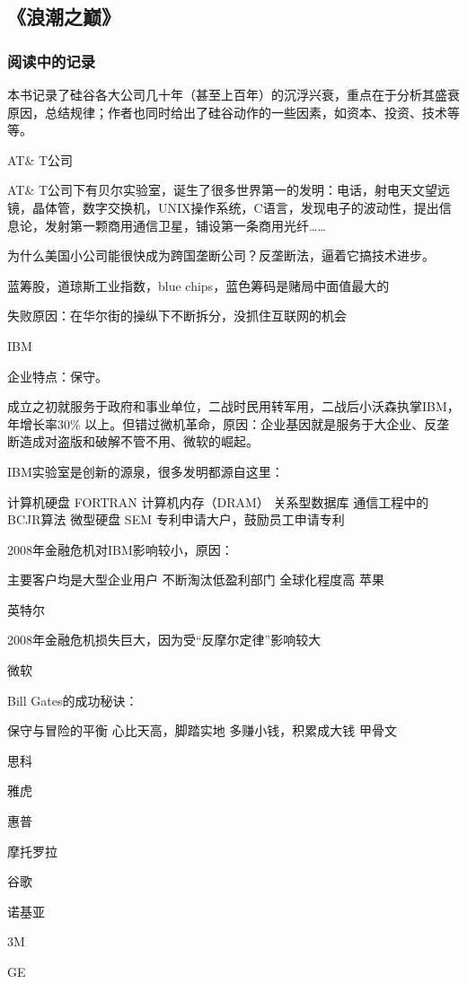 \subsection{《浪潮之巅》}
\subsubsection{阅读中的记录}
本书记录了硅谷各大公司几十年（甚至上百年）的沉浮兴衰，重点在于分析其盛衰原因，总结规律；作者也同时给出了硅谷动作的一些因素，如资本、投资、技术等等。

AT\& T公司

AT\& T公司下有贝尔实验室，诞生了很多世界第一的发明：电话，射电天文望远镜，晶体管，数字交换机，UNIX操作系统，C语言，发现电子的波动性，提出信息论，发射第一颗商用通信卫星，铺设第一条商用光纤……

为什么美国小公司能很快成为跨国垄断公司？反垄断法，逼着它搞技术进步。

蓝筹股，道琼斯工业指数，blue chips，蓝色筹码是赌局中面值最大的

失败原因：在华尔街的操纵下不断拆分，没抓住互联网的机会

IBM

企业特点：保守。

成立之初就服务于政府和事业单位，二战时民用转军用，二战后小沃森执掌IBM，年增长率30\% 以上。但错过微机革命，原因：企业基因就是服务于大企业、反垄断造成对盗版和破解不管不用、微软的崛起。

IBM实验室是创新的源泉，很多发明都源自这里：

计算机硬盘
FORTRAN
计算机内存（DRAM）
关系型数据库
通信工程中的BCJR算法
微型硬盘
SEM
专利申请大户，鼓励员工申请专利

2008年金融危机对IBM影响较小，原因：

主要客户均是大型企业用户
不断淘汰低盈利部门
全球化程度高
苹果

英特尔

2008年金融危机损失巨大，因为受“反摩尔定律”影响较大

微软

Bill Gates的成功秘诀：

保守与冒险的平衡
心比天高，脚踏实地
多赚小钱，积累成大钱
甲骨文

思科

雅虎

惠普

摩托罗拉

谷歌

诺基亚

3M

GE

